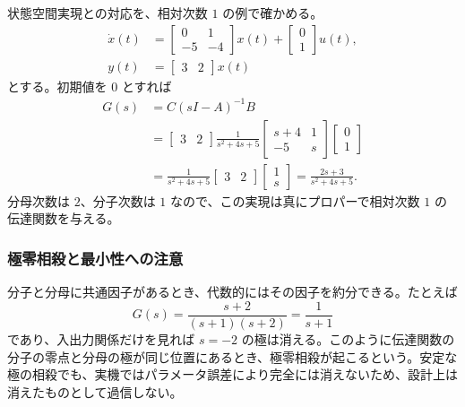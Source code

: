 状態空間実現との対応を、相対次数 $1$ の例で確かめる。
\begin{align}
  \dot{x}(t)
  &=
  \begin{bmatrix}
    0 & 1\\
    -5 & -4
  \end{bmatrix}x(t)
  +
  \begin{bmatrix}
    0\\
    1
  \end{bmatrix}u(t),\\
  y(t)
  &=
  \begin{bmatrix}
    3 & 2
  \end{bmatrix}x(t)
\end{align}
とする。初期値を 0 とすれば
\begin{align}
  G(s)
  &=C(sI-A)^{-1}B\\
  &=
  \begin{bmatrix}3 & 2\end{bmatrix}
  \frac{1}{s^2+4s+5}
  \begin{bmatrix}
    s+4 & 1\\
    -5 & s
  \end{bmatrix}
  \begin{bmatrix}
    0\\
    1
  \end{bmatrix}\\
  &=
  \frac{1}{s^2+4s+5}
  \begin{bmatrix}3 & 2\end{bmatrix}
  \begin{bmatrix}
    1\\
    s
  \end{bmatrix}
  =
  \frac{2s+3}{s^2+4s+5}.
\end{align}
分母次数は $2$、分子次数は $1$ なので、この実現は真にプロパーで相対次数 $1$ の伝達関数を与える。

\subsubsection{極零相殺と最小性への注意}

分子と分母に共通因子があるとき、代数的にはその因子を約分できる。たとえば
\begin{equation}
  G(s)=\frac{s+2}{(s+1)(s+2)}
  =
  \frac{1}{s+1}
\end{equation}
であり、入出力関係だけを見れば $s=-2$ の極は消える。このように伝達関数の分子の零点と分母の極が同じ位置にあるとき、極零相殺が起こるという。安定な極の相殺でも、実機ではパラメータ誤差により完全には消えないため、設計上は消えたものとして過信しない。

